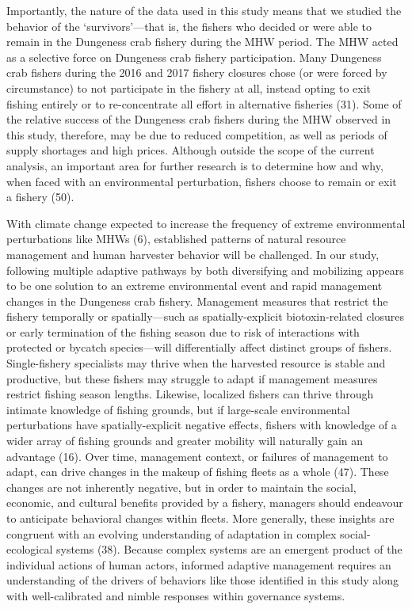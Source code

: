 \documentclass[9pt,twocolumn,twoside,lineno]{pnas-new}
\begin{document}
Importantly, the nature of the data used in this study means that we
studied the behavior of the `survivors'---that is, the fishers who
decided or were able to remain in the Dungeness crab fishery during the
MHW period. The MHW acted as a selective force on Dungeness crab fishery
participation. Many Dungeness crab fishers during the 2016 and 2017
fishery closures chose (or were forced by circumstance) to not
participate in the fishery at all, instead opting to exit fishing
entirely or to re-concentrate all effort in alternative fisheries (31).
Some of the relative success of the Dungeness crab fishers during the
MHW observed in this study, therefore, may be due to reduced
competition, as well as periods of supply shortages and high prices.
Although outside the scope of the current analysis, an important area
for further research is to determine how and why, when faced with an
environmental perturbation, fishers choose to remain or exit a fishery
(50).

With climate change expected to increase the frequency of extreme
environmental perturbations like MHWs (6), established patterns of
natural resource management and human harvester behavior will be
challenged. In our study, following multiple adaptive pathways by both
diversifying and mobilizing appears to be one solution to an extreme
environmental event and rapid management changes in the Dungeness crab
fishery. Management measures that restrict the fishery temporally or
spatially---such as spatially-explicit biotoxin-related closures or
early termination of the fishing season due to risk of interactions with
protected or bycatch species---will differentially affect distinct
groups of fishers. Single-fishery specialists may thrive when the
harvested resource is stable and productive, but these fishers may
struggle to adapt if management measures restrict fishing season
lengths. Likewise, localized fishers can thrive through intimate
knowledge of fishing grounds, but if large-scale environmental
perturbations have spatially-explicit negative effects, fishers with
knowledge of a wider array of fishing grounds and greater mobility will
naturally gain an advantage (16). Over time, management context, or
failures of management to adapt, can drive changes in the makeup of
fishing fleets as a whole (47). These changes are not inherently
negative, but in order to maintain the social, economic, and cultural
benefits provided by a fishery, managers should endeavour to anticipate
behavioral changes within fleets. More generally, these insights are
congruent with an evolving understanding of adaptation in complex
social-ecological systems (38). Because complex systems are an emergent
product of the individual actions of human actors, informed adaptive
management requires an understanding of the drivers of behaviors like
those identified in this study along with well-calibrated and nimble
responses within governance systems.
\end{document}
